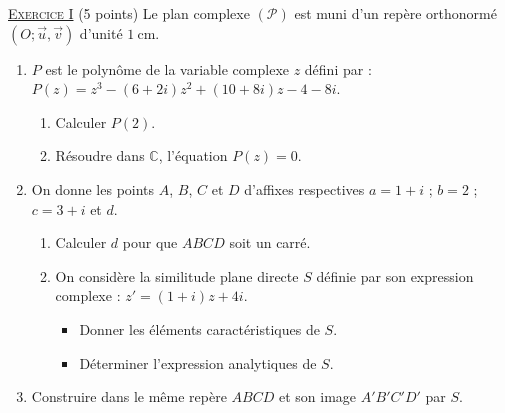 \providecommand{\Courbe}{(\mathscr{C})}
\providecommand{\D}{(\mathscr{D})}
\providecommand{\Plan}{(\mathscr{P})}
\providecommand{\Ouv}{(O ; \vec{u} , \vec{v})}
\providecommand{\cm}{~\mathrm{cm}}
\providecommand{\dx}{~\mathrm{d}x}
\providecommand{\Arg}[1]{\mathrm{Arg}\left( #1 \right)}
\noindent \underline{\textsc{Exercice I}} (5 points) \newline
      Le plan complexe $\Plan$ est muni d'un rep\`ere orthonorm\'e $\Ouv$ d'unit\'e $1\cm$.
      \begin{enumerate}
            \item $P$ est le polyn\^ome de la variable complexe $z$ d\'efini par : 
                  $P(z) = z^3 - (6+2i) z^2 + (10+8i) z - 4 - 8i$.
                  \begin{enumerate}
                        \item Calculer $P(2)$.
                        \item R\'esoudre dans $\mathbb{C}$, l'\'equation $P(z) = 0$.
                  \end{enumerate}
            \item On donne les points $A$, $B$, $C$ et $D$ d'affixes respectives $a = 1+i$ ; $b = 2$ ; $c = 3+i$ et $d$.
                  \begin{enumerate}
                        \item Calculer $d$ pour que $ABCD$ soit un carr\'e.
                        \item On consid\`ere la similitude plane directe $S$ d\'efinie par son expression complexe :
                              $z' = (1+i) z + 4i$.
                              \begin{itemize}
                                    \item Donner les \'el\'ements caract\'eristiques de $S$.
                                    \item D\'eterminer l'expression analytiques de $S$.
                              \end{itemize}
                  \end{enumerate}
            \item Construire dans le m\^eme rep\`ere $ABCD$ et son image $A'B'C'D'$ par $S$.
      \end{enumerate}
